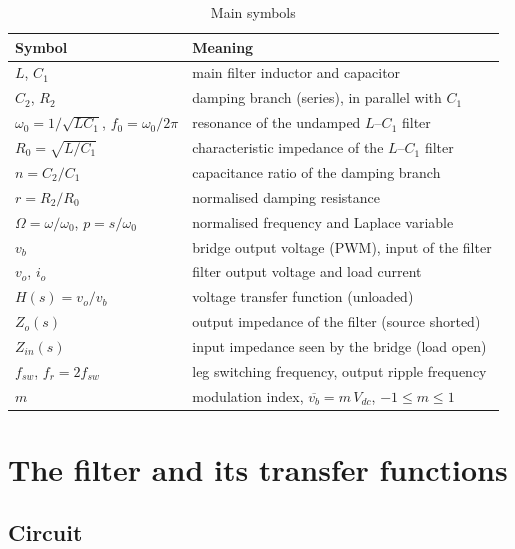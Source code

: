 \documentclass[11pt,a4paper]{article}
\begin{document}
\begin{table}[h]
\centering
\small
\caption{Main symbols}
\begin{tabular}{ll}
\toprule
Symbol & Meaning \\
\midrule
$L$, $C_1$ & main filter inductor and capacitor \\
$C_2$, $R_2$ & damping branch (series), in parallel with $C_1$ \\
$\omega_0 = 1/\sqrt{L C_1}$, $f_0 = \omega_0/2\pi$ & resonance of the undamped $L$--$C_1$ filter \\
$R_0 = \sqrt{L/C_1}$ & characteristic impedance of the $L$--$C_1$ filter \\
$n = C_2/C_1$ & capacitance ratio of the damping branch \\
$r = R_2/R_0$ & normalised damping resistance \\
$\Omega = \omega/\omega_0$, $p = s/\omega_0$ & normalised frequency and Laplace variable \\
$v_b$ & bridge output voltage (PWM), input of the filter \\
$v_o$, $i_o$ & filter output voltage and load current \\
$H(s) = v_o/v_b$ & voltage transfer function (unloaded) \\
$Z_o(s)$ & output impedance of the filter (source shorted) \\
$Z_{in}(s)$ & input impedance seen by the bridge (load open) \\
$f_{sw}$, $f_r = 2 f_{sw}$ & leg switching frequency, output ripple frequency \\
$m$ & modulation index, $\overline{v_b} = m\,V_{dc}$, $-1 \le m \le 1$ \\
\bottomrule
\end{tabular}
\end{table}

\section{The filter and its transfer functions}
\label{sec:filter}

\subsection{Circuit}
\end{document}
